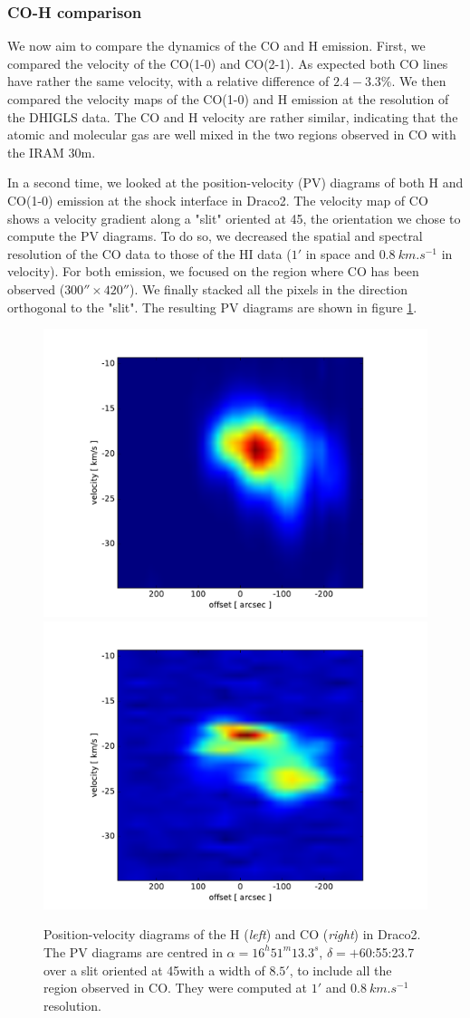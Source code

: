 \documentclass[traditabstract]{aa}
\begin{document}
\subsubsection{CO-H comparison}

   We now aim to compare the dynamics of the CO and H emission. First, we compared the velocity of the CO(1-0) and CO(2-1). As expected both CO lines have rather the same velocity, with a relative difference of $2.4-3.3\%$. We then compared the velocity maps of the CO(1-0) and H emission at the resolution of the DHIGLS data. The CO and H velocity are rather similar, indicating that the atomic and molecular gas are well mixed in the two regions observed in CO with the IRAM 30m.

   In a second time, we looked at the position-velocity (PV) diagrams of both H and CO(1-0) emission at the shock interface in Draco2. The velocity map of CO shows a velocity gradient along a "slit" oriented at 45\degree, the orientation we chose to compute the PV diagrams. To do so, we decreased the spatial and spectral resolution of the CO data to those of the HI data ($1'$ in space and $0.8\: km.s^{-1}$ in velocity). For both emission, we focused on the region where CO has been observed ($300''\times 420''$). We finally stacked all the pixels in the direction orthogonal to the "slit". The resulting PV diagrams are shown in figure \ref{PV-diag}.

\begin{figure}[h!]
  \centering
  \includegraphics[width=0.48\linewidth,trim=70 10 95 40,clip=true]{Figures/PV_diagram_HI.pdf}
  \hspace{3mm}
  \includegraphics[width=0.48\linewidth,trim=70 10 95 40,clip=true]{Figures/PV_diagram_CO.pdf}
  \caption{\label{PV-diag} Position-velocity diagrams of the H (\emph{left}) and CO (\emph{right}) in Draco2. The PV diagrams are centred in $\alpha=16^h 51^m 13.3^s$, $\delta=+$60:55:23.7 over a slit oriented at 45\degree with a width of $8.5'$, to include all the region observed in CO. They were computed at $1'$ and $0.8\: km.s^{-1}$ resolution.}
\end{figure}
\end{document}
